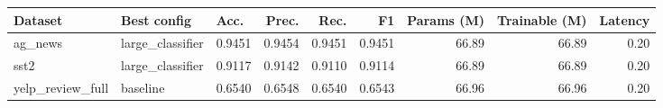 \begin{tabular}{lllrrrrrr}
\toprule
Dataset & Best config & Acc. & Prec. & Rec. & F1 & Params (M) & Trainable (M) & Latency \\
\midrule
ag\_news & large\_classifier & 0.9451 & 0.9454 & 0.9451 & 0.9451 & 66.89 & 66.89 & 0.20 \\
sst2 & large\_classifier & 0.9117 & 0.9142 & 0.9110 & 0.9114 & 66.89 & 66.89 & 0.20 \\
yelp\_review\_full & baseline & 0.6540 & 0.6548 & 0.6540 & 0.6543 & 66.96 & 66.96 & 0.20 \\
\bottomrule
\end{tabular}
